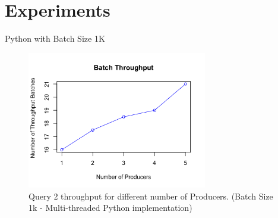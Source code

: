 \documentclass[9pt]{beamer}
\begin{document}

\section{Experiments}






\begin{frame}[fragile]{Python with Batch Size 1K  }
    
    \begin{figure}
        \begin{center}
            \includegraphics[width=0.7\textwidth]{../paper/images/throughput.png}
            \caption{Query 2 throughput for different number of Producers. (Batch Size 1k - Multi-threaded Python implementation) }
            \label{fig:evaluation}
        \end{center}
    \end{figure}
\end{frame}






\end{document}
